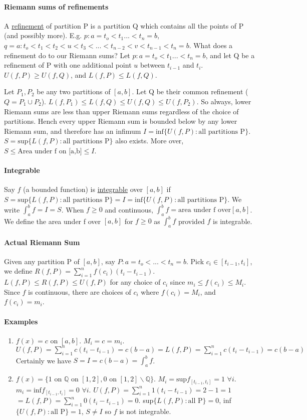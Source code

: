 \documentclass[10pt,letter]{article}
\begin{document}
\paragraph*{Riemann sums of refinements}
A \underline{refinement} of partition P is a partition Q which contains all the points of P (and possibly more). E.g. $p:a=t_o<t_1...<t_n=b$, $q=a:t_o<t_1<t_2<u<t_3<...<t_{n-2}<v<t_{n-1}<t_n=b$. What does a refinement do to our Riemann sums? Let $p:a=t_o<t_1...<t_n=b$, and let Q be a refinement of P with one additional point $u$ between $t_{i-1}$ and $t_i$. $U(f,P)\geq U(f,Q)$, and $L(f,P)\leq L(f,Q)$. 

Let $P_1,P_2$ be any two partitions of $[a,b]$. Let Q be their common refinement ($Q=P_1\cup P_2$). $L(f,P_1)\leq L(f,Q)\leq U(f,Q)\leq U(f,P_2)$. So always, lower Riemann sums are less than upper Riemann sums regardless of the choice of partitions. Hench every upper Riemann sum is bounded below by any lower Riemann sum, and therefore has an infimum $I = \text{inf}\{U(f,P):\text{all partitions P}\}$. $S=\text{sup}\{L(f,P):\text{all partitions P}\}$ also exists. More over, $S\leq \text{Area under f on [a,b]}\leq I$. 

\paragraph{Integrable}
Say $f$ (a bounded function) is \underline{integrable} over $[a,b]$ if $S=\text{sup}\{L(f,P):\text{all partitions P}\} = I=\text{inf}\{U(f,P):\text{all partitions P}\}$. We write $\int_a^bf=I=S$. When $f\geq0$ and continuous, $\int_a^bf=\text{area under f over}[a,b]$. We define the area under f over $[a,b]$ for $f\geq0$ as $\int_a^bf$ provided $f$ is integrable. 

\paragraph{Actual Riemann Sum}
Given any partition P of $[a,b]$, say $P:a=t_o<...<t_n=b$. Pick $c_i\in[t_{i-1},t_i]$, we define $R(f,P)=\sum_{i=1}^nf(c_i)(t_i-t_{i-1})$. $L(f,P)\leq R(f,P)\leq U(f,P)$ for any choice of $c_i$ since $m_i\leq f(c_i)\leq M_i$. Since $f$ is continuous, there are choices of $c_i$ where $f(c_i)=M_i$, and $f(c_i)=m_i$. 

\paragraph{Examples}
\begin{enumerate}
    \item $f(x)=c$ on $[a,b]$. $M_i=c=m_i$. $U(f,P)=\sum_{i=1}^nc(t_i-t_{i-1})=c(b-a)=L(f,P)=\sum_{i=1}^nc(t_i-t_{i-1})=c(b-a)$ Certainly we have $S=I=c(b-a)=\int_a^bf$. 
    \item $f(x)=\{\text{1 on }\mathbb{Q}\text{ on }[1,2], \text{0 on }[1,2]\backslash\mathbb{Q}\}$. $M_i=\text{sup}f_{[t_{i-1},t_i]} = 1$ $\forall i$. $m_i=\text{inf}f_{[t_{i-1},t_i]} = 0$ $\forall i$. $U(f,P)=\sum_{i=1}^n1(t_i-t_{i-1})=2-1=1$ $=L(f,P)=\sum_{i=1}^n0(t_i-t_{i-1})=0$. sup$\{L(f,P): \text{all P}\} = 0$, inf$\{U(f,P): \text{all P}\} = 1$, $S\neq I$ so $f$ is not integrable. 
\end{enumerate}
\end{document}
